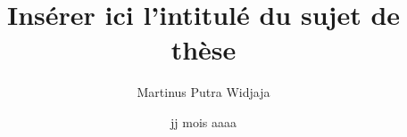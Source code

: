 \documentclass[a4paper, 10pt]{book}
\title{Insérer ici l'intitulé du sujet de thèse}
\author{Martinus Putra Widjaja}
\institute{MINES ParisTech}
\date{jj mois aaaa}
\begin{document}
\maketitle{}

\tableofcontents
\listoffigures





% 


%
%
%
%
%
%
%
%



\end{document}
